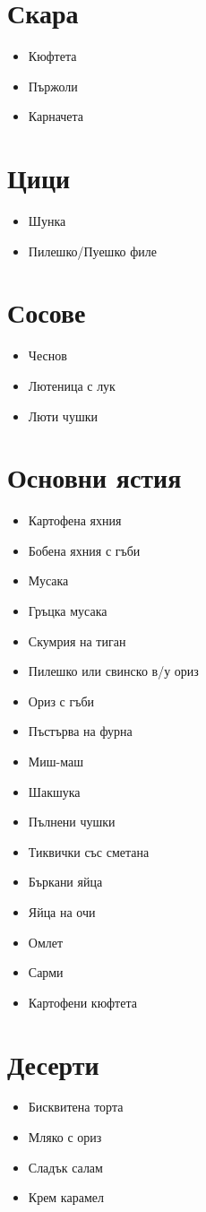 \documentclass{article}
\begin{document}
\begin{multicols}{2}
\section{Скара}
\begin{itemize}
    \item{Кюфтета}
    \item{Пържоли}
    \item{Карначета}
\end{itemize}

\section{Цици}
\begin{itemize}
    \item{Шунка}
    \item{Пилешко/Пуешко филе}
\end{itemize}

\section{Сосове}
\begin{itemize}
    \item{Чеснов}
    \item{Лютеница с лук}
    \item{Люти чушки}
\end{itemize}

\section{Основни ястия}
\begin{itemize}
    \item{Картофена яхния}
    \item{Бобена яхния с гъби}
    \item{Мусака}
    \item{Гръцка мусака}
    \item{Скумрия на тиган}
    \item{Пилешко или свинско в/у ориз}
    \item{Ориз с гъби}
    \item{Пъстърва на фурна}
    \item{Миш-маш}
    \item{Шакшука}
    \item{Пълнени чушки}
    \item{Тиквички със сметана}
    \item{Бъркани яйца}
    \item{Яйца на очи}
    \item{Омлет}
    \item{Сарми}
    \item{Картофени кюфтета}
\end{itemize}

\section{Десерти}
\begin{itemize}
    \item{Бисквитена торта}
    \item{Мляко с ориз}
    \item{Сладък салам}
    \item{Крем карамел}
\end{itemize}
\end{multicols}
\end{document}
